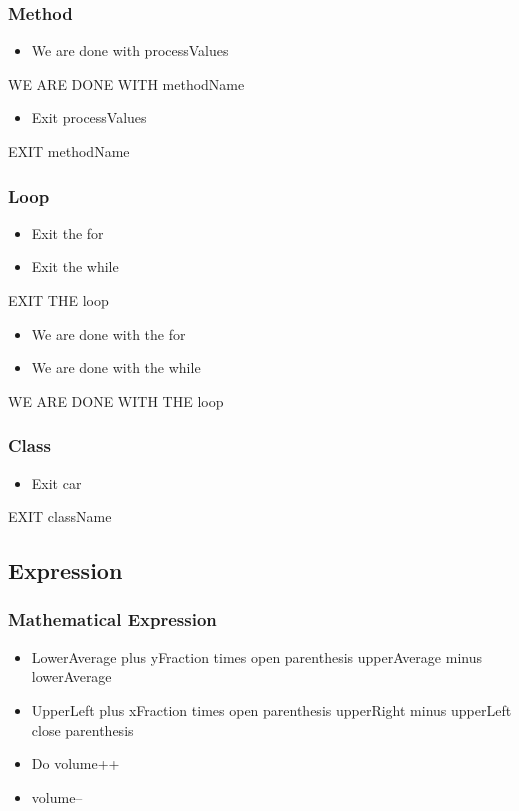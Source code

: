 \subsubsection{Method}
\begin{itemize}
	\item We are done with processValues
\end{itemize}
WE ARE DONE WITH methodName
\begin{itemize}
	\item Exit processValues
\end{itemize}
EXIT methodName
\subsubsection{Loop}
\begin{itemize}
	\item Exit the for
	\item Exit the while	
\end{itemize}
EXIT THE loop
\begin{itemize}
	\item We are done with the for
	\item We are done with the while
\end{itemize}
WE ARE DONE WITH THE loop
\subsubsection{Class}
\begin{itemize}
	\item Exit car
\end{itemize}
EXIT className
\subsection{Expression}
\subsubsection{Mathematical Expression}
\begin{itemize}
	\item LowerAverage plus yFraction times open parenthesis upperAverage minus lowerAverage
	\item UpperLeft plus xFraction times open parenthesis upperRight minus upperLeft close parenthesis
	\item Do volume++
	\item volume--
\end{itemize}
